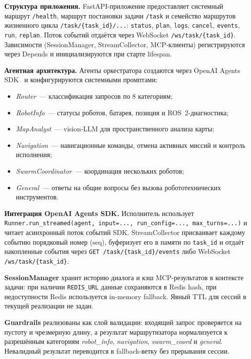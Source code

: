 \documentclass[14pt,a4paper]{extreport}
\begin{document}
\textbf{Структура приложения.} FastAPI-приложение предоставляет системный маршрут \texttt{/health}, маршрут постановки задачи \texttt{/task} и семейство маршрутов жизненного цикла \texttt{/task/\{task\_id\}/...}: \texttt{status}, \texttt{plan}, \texttt{logs}, \texttt{cancel}, \texttt{events}, \texttt{run}, \texttt{replan}. Поток событий отдаётся через WebSocket \texttt{/ws/task/\{task\_id\}}. Зависимости (SessionManager, StreamCollector, MCP-клиенты) регистрируются через Depends и инициализируются при старте lifespan.

\textbf{Агентная архитектура.} Агенты оркестратора создаются через OpenAI Agents SDK~\cite{openai_agents} и конфигурируются системными промптами:
\begin{itemize}
  \item \textit{Router}~--- классификация запросов по 8 категориям;
  \item \textit{RobotInfo}~--- статусы роботов, батарея, позиция и ROS~2-диагностика;
  \item \textit{MapAnalyst}~--- vision-LLM для пространственного анализа карты;
  \item \textit{Navigation}~--- навигационные команды, отмена активных миссий и контроль исполнения;
  \item \textit{SwarmCoordinator}~--- координация нескольких роботов;
  \item \textit{General}~--- ответы на общие вопросы без вызова робототехнических инструментов.
\end{itemize}

\textbf{Интеграция OpenAI Agents SDK.} Исполнитель использует \texttt{Runner.run\_streamed(agent, input=..., run\_config=..., max\_turns=...)} и читает асинхронный поток событий SDK. StreamCollector присваивает каждому событию порядковый номер (seq), буферизует его в памяти по \texttt{task\_id} и отдаёт накопленные события через \texttt{GET /task/\{task\_id\}/events} либо WebSocket \texttt{/ws/task/\{task\_id\}}.

\textbf{SessionManager} хранит историю диалога и кэш MCP-результатов в контексте задачи: при наличии \texttt{REDIS\_URL} данные сохраняются в Redis hash, при недоступности Redis используется in-memory fallback. Явный TTL для сессий в текущей реализации не задан.

\textbf{Guardrails} реализованы как слой валидации: входящий запрос проверяется на пустоту и чрезмерную длину, а результат маршрутизатора нормализуется к разрешённым категориям \textit{robot\_info}, \textit{navigation}, \textit{swarm\_coord} и \textit{general}. Невалидный результат переводится в fallback-ветку без прерывания сессии.
\end{document}
